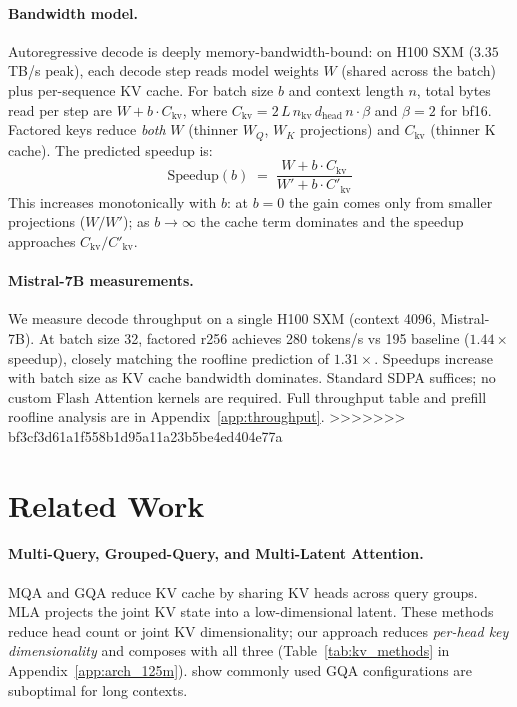 \documentclass{article} %
\begin{document}
\paragraph{Bandwidth model.}
Autoregressive decode is deeply memory-bandwidth-bound: on H100 SXM ($3.35$\,TB/s peak), each decode step reads model weights $W$ (shared across the batch) plus per-sequence KV cache.
For batch size $b$ and context length $n$, total bytes read per step are $W + b \cdot C_{\mathrm{kv}}$, where $C_{\mathrm{kv}} = 2\, L\, n_{\mathrm{kv}}\, d_{\mathrm{head}}\, n \cdot \beta$ and $\beta = 2$ for bf16.
Factored keys reduce \emph{both} $W$ (thinner $W_Q$, $W_K$ projections) and $C_{\mathrm{kv}}$ (thinner K cache).
The predicted speedup is:
\begin{equation}\label{eq:roofline}
\mathrm{Speedup}(b) \;=\; \frac{W + b \cdot C_{\mathrm{kv}}}{W' + b \cdot C'_{\mathrm{kv}}}
\end{equation}
This increases monotonically with $b$: at $b{=}0$ the gain comes only from smaller projections ($W/W'$); as $b \to \infty$ the cache term dominates and the speedup approaches $C_{\mathrm{kv}}/C'_{\mathrm{kv}}$.

\paragraph{Mistral-7B measurements.}
We measure decode throughput on a single H100 SXM (context 4096, Mistral-7B). At batch size 32, factored r256 achieves 280 tokens/s vs 195 baseline ($1.44\times$ speedup), closely matching the roofline prediction of $1.31\times$. Speedups increase with batch size as KV cache bandwidth dominates. Standard SDPA suffices; no custom Flash Attention kernels are required. Full throughput table and prefill roofline analysis are in Appendix~\ref{app:throughput}.
>>>>>>> bf3cf3d61a1f558b1d95a11a23b5be4ed404e77a


\section{Related Work}

\paragraph{Multi-Query, Grouped-Query, and Multi-Latent Attention.}
MQA \citep{shazeer2019fast} and GQA \citep{ainslie2023gqa} reduce KV cache by sharing KV heads across query groups. MLA \citep{liu2024deepseek} projects the joint KV state into a low-dimensional latent. These methods reduce head count or joint KV dimensionality; our approach reduces \emph{per-head key dimensionality} and composes with all three (Table~\ref{tab:kv_methods} in Appendix~\ref{app:arch_125m}). \citet{costoptimalgqa2025} show commonly used GQA configurations are suboptimal for long contexts.
\end{document}
